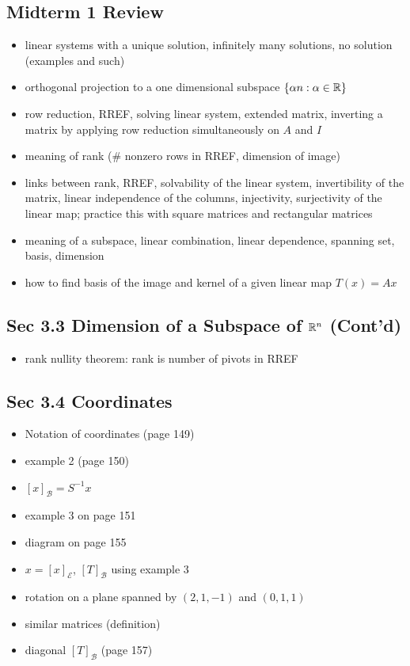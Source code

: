 \documentclass[12pt,a4paper]{article}
\def\R{\ifmmode\mathbb R\fi}
\begin{document}
\subsection*{Midterm 1 Review}
\begin{itemize}
    \item linear systems with a unique solution, infinitely many solutions, no solution (examples and such)
    \item orthogonal projection to a one dimensional subspace $\{\alpha n: \alpha \in \R\}$ 
    \item row reduction, RREF, solving linear system, extended matrix, inverting a matrix by applying row reduction simultaneously on $A$ and $I$
    \item meaning of rank (\# nonzero rows in RREF, dimension of image)
    \item links between rank, RREF, solvability of the linear system, invertibility of the matrix, linear independence of the columns, injectivity, surjectivity of the linear map; practice this with square matrices and rectangular matrices
    \item meaning of a subspace, linear combination, linear dependence, spanning set, basis, dimension
    \item how to find basis of the image and kernel of a given linear map $T(x) = Ax$
\end{itemize}


\subsection*{Sec 3.3 Dimension of a Subspace of $\R^n$ (Cont'd)}
\begin{itemize}
    \item rank nullity theorem: rank is number of pivots in RREF
\end{itemize}

\subsection*{Sec 3.4 Coordinates}
\begin{itemize}
    \item Notation of coordinates (page 149)
    \item example 2 (page 150)
    \item $[x]_{\mathcal B} = S^{-1}x$
    \item example 3 on page 151
    \item diagram on page 155
    \item $x = [x]_{\mathcal E}$, $[T]_{\mathcal B}$ using example 3
    \item rotation on a plane spanned by $(2, 1, -1)$ and $(0, 1, 1)$
    \item similar matrices (definition)
    \item diagonal $[T]_{\mathcal B}$ (page 157)
\end{itemize}
\end{document}
